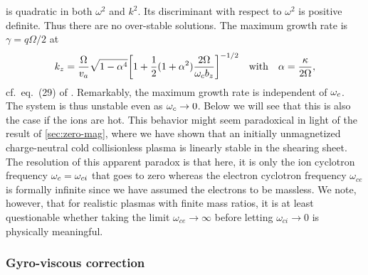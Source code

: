 \documentclass[aps,pre,notitlepage,amsmath,amssymb,amsfonts,nobibnotes,nofootinbib]{revtex4-1}
\begin{document}
 is quadratic in both $\omega^2$ and $k^2$. Its
discriminant with respect to $\omega^2$ is positive definite. Thus there are
no over-stable solutions. The maximum growth rate is $\gamma=q\Omega/2$ at
\begin{equation}
  k_z = \frac{\Omega}{\va}
  \sqrt{1 - \alpha^4}
  {\left[1 + \frac{1}{2}(1 + \alpha^2)\frac{2\Omega}{\omc b_z}\right]}^{-1/2}
  \quad\textrm{with}\quad
  \alpha = \frac{\kappa}{2\Omega},
\end{equation}
cf.\ eq.~(29) of \citet{Wardle1999}. Remarkably, the maximum growth rate is
independent of $\omega_c$. The system is thus unstable even as $\omega_c\to0$. Below
we will see that this is also the case if the ions are hot. This behavior
might seem paradoxical in light of the result of \cref{sec:zero-mag}, where we
have shown that an initially unmagnetized charge-neutral cold collisionless
plasma is linearly stable in the shearing sheet. The resolution of this
apparent paradox is that here, it is only the ion cyclotron frequency
$\omega_c=\omega_{ci}$ that goes to zero whereas the electron cyclotron frequency
$\omega_{ce}$ is formally infinite since we have assumed the electrons to be
massless. We note, however, that for realistic plasmas with finite mass
ratios, it is at least questionable whether taking the limit
$\omega_{ce}\to\infty$ before letting $\omega_{ci}\to{}0$ is physically
meaningful.

\subsubsection{Gyro-viscous correction}
\label{sec:gyro-viscous}
\end{document}

